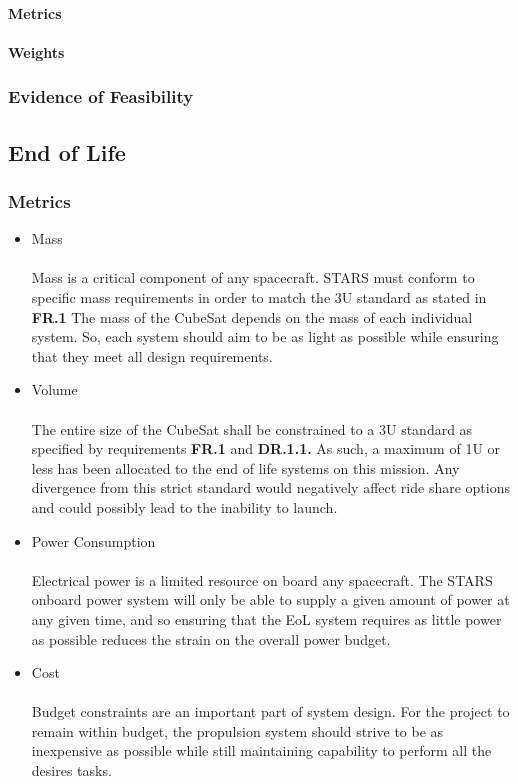 \documentclass{ece}
\begin{document}
\paragraph{Metrics}
\paragraph{Weights}
\subsubsection{Evidence of Feasibility}

\subsection{End of Life}
\subsubsection{Metrics}
\begin{itemize}
\item Mass\\
\\
Mass is a critical component of any spacecraft. STARS must conform to specific mass requirements in order to match the 3U standard as stated in \textbf{FR.1} The mass of the CubeSat depends on the mass of each individual system. So, each system should aim to be as light as possible while ensuring that they meet all design requirements. 
\item{Volume} \\
\\
The entire size of the CubeSat shall be constrained to a 3U standard as specified by requirements \textbf{FR.1}  and  \textbf{DR.1.1.}  As  such,  a maximum  of  1U  or  less  has  been  allocated  to  the  end  of  life  systems on  this mission. Any  divergence  from  this  strict  standard  would  negatively  affect  ride  share options  and  could possibly lead to the inability to launch. 

\item{Power Consumption} \\
\\
Electrical power is a limited resource on board any spacecraft. The STARS onboard power system will only be able to supply a given amount of power at any given time, and so ensuring that the EoL system requires as little power as possible reduces the strain on the overall power budget.
\item{Cost} \\
\\
Budget constraints are an important part of system design. For the project to remain within budget, the propulsion system should strive to be as inexpensive as possible while still maintaining capability to perform all the desires tasks.  
\end{itemize}
\end{document}

